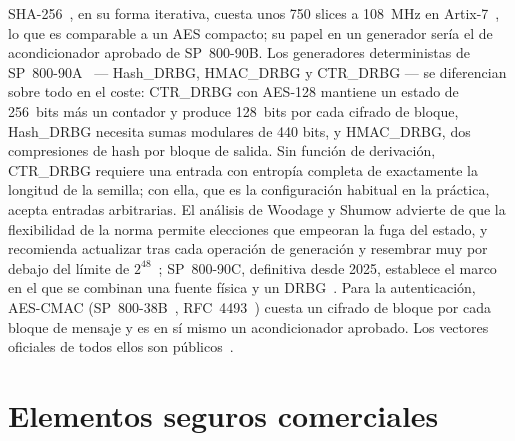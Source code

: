 SHA-256~\cite{nist_2015_fips1804}, en su forma iterativa, cuesta unos 750
slices a 108~MHz en Artix-7~\cite{strombergson_sha256}, lo que es
comparable a un AES compacto; su papel en un generador sería el de
acondicionador aprobado de SP~800-90B. Los generadores deterministas de
SP~800-90A~\cite{barker_2015_sp80090ar1} --- Hash\_DRBG, HMAC\_DRBG y
CTR\_DRBG --- se diferencian sobre todo en el coste: CTR\_DRBG con
AES-128 mantiene un estado de 256~bits más un contador y produce
128~bits por cada cifrado de bloque, Hash\_DRBG necesita sumas modulares
de 440 bits, y HMAC\_DRBG, dos compresiones de hash por bloque de salida.
Sin función de derivación, CTR\_DRBG requiere una entrada con entropía
completa de exactamente la longitud de la semilla; con ella, que es la
configuración habitual en la práctica, acepta entradas arbitrarias. El
análisis de Woodage y Shumow advierte de que la flexibilidad de la norma
permite elecciones que empeoran la fuga del estado, y recomienda
actualizar tras cada operación de generación y resembrar muy por debajo
del límite de $2^{48}$~\cite{woodage_2019_analysis}; SP~800-90C,
definitiva desde 2025, establece el marco en el que se combinan una
fuente física y un DRBG~\cite{barker_2025_sp80090c}. Para la
autenticación, AES-CMAC (SP~800-38B~\cite{nist_2016_sp80038b},
RFC~4493~\cite{song_2006_rfc4493}) cuesta un cifrado de bloque por cada
bloque de mensaje y es en sí mismo un acondicionador aprobado. Los
vectores oficiales de todos ellos son
públicos~\cite{nist_cavp_blockciphers, nist_cavp_modes, nist_cavp_drbg,
nist_acvp_server}.

\section{Elementos seguros comerciales}
\label{sec:soa_se}

